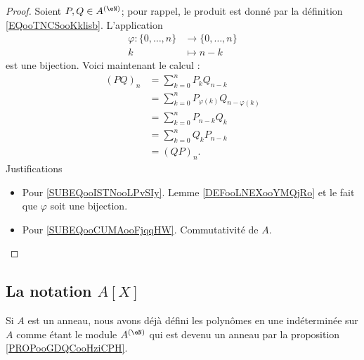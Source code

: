 \begin{proof}
	Soient \( P,Q\in A^{(\eN)}\); pour rappel, le produit est donné par la définition \ref{EQooTNCSooKklisb}. L'application
	\begin{equation}
		\begin{aligned}
			\varphi\colon \{ 0,\ldots, n \} & \to \{ 0,\ldots, n \} \\
			k                               & \mapsto n-k
		\end{aligned}
	\end{equation}
	est une bijection. Voici maintenant le calcul :
	\begin{subequations}
		\begin{align}
			(PQ)_n & =\sum_{k=0}^nP_kQ_{n-k}                                                    \\
			       & =\sum_{k=0}^nP_{\varphi(k)}Q_{n-\varphi(k)}    \label{SUBEQooISTNooLPvSIy} \\
			       & =\sum_{k=0}^nP_{n-k}Q_{k}                                                  \\
			       & =\sum_{k=0}^nQ_kP_{n-k}      \label{SUBEQooCUMAooFjqqHW}                   \\
			       & =(QP)_n.
		\end{align}
	\end{subequations}
	Justifications
	\begin{itemize}
		\item Pour \eqref{SUBEQooISTNooLPvSIy}. Lemme \ref{DEFooLNEXooYMQjRo} et le fait que \( \varphi\) soit une bijection.
		\item Pour \eqref{SUBEQooCUMAooFjqqHW}. Commutativité de \( A\).
	\end{itemize}
\end{proof}


\subsection{La notation \texorpdfstring{\(  A[X]\)}{A[X]}}
\label{SUBSECooLEKVooFBPSJz}

Si \( A\) est un anneau, nous avons déjà défini les polynômes en une indéterminée sur \( A\) comme étant le module \( A^{(\eN)}\) qui est devenu un anneau par la proposition \ref{PROPooGDQCooHziCPH}.

